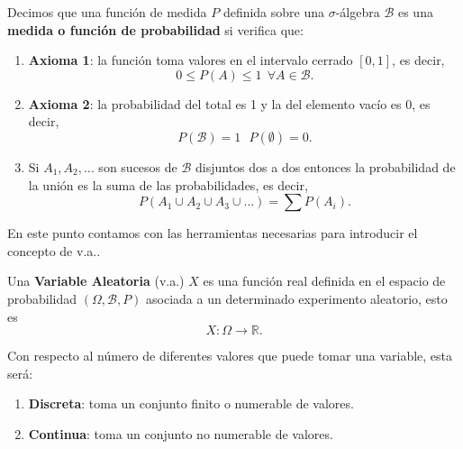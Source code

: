 \begin{definition}
    Decimos que una función de medida $P$ definida sobre una $\sigma$-álgebra $\mathcal{B}$ es una \textbf{medida o función de probabilidad} si verifica que:
    \begin{enumerate}
        \item \textbf{Axioma 1}: la función toma valores en el intervalo cerrado $[0, 1]$, es decir,
        \begin{equation}
            0 \le P(A) \le 1 \ \ \forall A \in \mathcal{B}.
        \end{equation}

        \item \textbf{Axioma 2}: la probabilidad del total es 1 y la del elemento vacío es 0, es decir,
        \begin{equation}
            P(\mathcal{B}) = 1 \ \ \ P(\emptyset) = 0.
        \end{equation}

        \item Si $A_1, A_2, \ldots$ son sucesos de $\mathcal{B}$ disjuntos dos a dos entonces la probabilidad de la unión es la suma de las probabilidades, es decir,
        \begin{equation}
            P(A_1 \cup A_2 \cup A_3 \cup \ldots) = \sum P(A_i).
        \end{equation}
    \end{enumerate}
\end{definition}

En este punto contamos con las herramientas necesarias para introducir el concepto de \ac{v.a.}.

\begin{definition}
    Una \textbf{Variable Aleatoria} (\ac{v.a.}) $X$ es una función real definida en el espacio de probabilidad $(\Omega, \mathcal{B}, P)$ asociada a un determinado experimento aleatorio, esto es
    \begin{equation}
        X: \Omega \to \mathbb{R}.
    \end{equation}

    Con respecto al número de diferentes valores que puede tomar una variable, esta será:
    \begin{enumerate}
        \item \textbf{Discreta}: toma un conjunto finito o numerable de valores.
        \item \textbf{Continua}: toma un conjunto no numerable de valores.
    \end{enumerate}
\end{definition}

